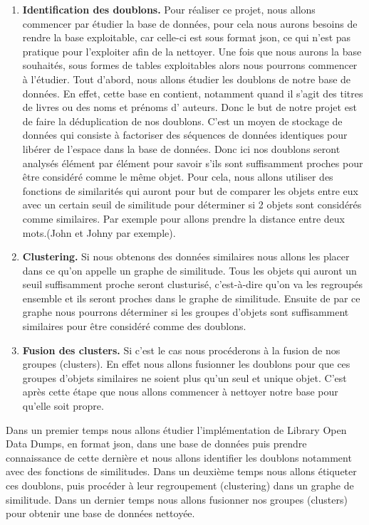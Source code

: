 \documentclass[12pt, a4paper]{article}
\begin{document}
\begin{enumerate}
\item \textbf{Identification des doublons.} Pour réaliser ce projet, nous allons commencer par étudier la base de données, pour cela nous aurons besoins de rendre la base exploitable, car celle-ci est sous format json, ce qui n’est pas pratique pour l’exploiter afin de la nettoyer. Une fois que nous aurons la base souhaités, sous formes de tables exploitables alors nous pourrons commencer à l’étudier.
Tout d’abord, nous allons  étudier les doublons de notre base de données. En effet, cette base en contient, notamment quand il s'agit des titres de livres ou des noms et prénoms d' auteurs. Donc le but de notre projet est de faire la déduplication de nos doublons. C’est un moyen de stockage de données qui consiste à  factoriser des séquences de données identiques pour libérer de l’espace dans la base de données. Donc ici nos doublons seront analysés élément par élément pour savoir s’ils sont suffisamment proches pour être considéré comme le même objet.
Pour cela, nous allons utiliser des fonctions de similarités qui auront pour but de comparer les objets entre eux avec un certain seuil de similitude pour déterminer si 2 objets sont considérés comme similaires. Par exemple pour allons prendre la distance entre deux mots.(John et Johny par exemple).



\item \textbf{Clustering.}
Si nous obtenons des données similaires nous allons les placer dans ce qu’on appelle un graphe de similitude. Tous les objets qui auront un seuil suffisamment proche seront clusturisé, c’est-à-dire qu’on va les regroupés ensemble et ils seront proches dans le graphe de similitude. Ensuite de par ce  graphe nous pourrons déterminer si les groupes d’objets sont suffisamment similaires pour être considéré comme des doublons.


\item \textbf{Fusion des clusters.} Si c’est le cas nous procéderons à la fusion de nos groupes (clusters). En effet nous allons fusionner les doublons pour que ces groupes d’objets similaires ne soient plus qu’un seul et unique objet. C'est après cette étape que nous allons commencer à nettoyer notre base pour qu'elle soit propre. 


\end{enumerate}


Dans un premier temps nous allons étudier l'implémentation de Library Open Data Dumps, en format json, dans une base de données puis prendre connaissance de cette dernière et nous allons identifier les doublons notamment avec des fonctions de similitudes.
Dans un deuxième temps nous allons étiqueter ces doublons, puis procéder à leur regroupement (clustering) dans un graphe de similitude.
Dans un dernier temps nous allons fusionner nos groupes (clusters) pour obtenir une base de données nettoyée.
\end{document}
